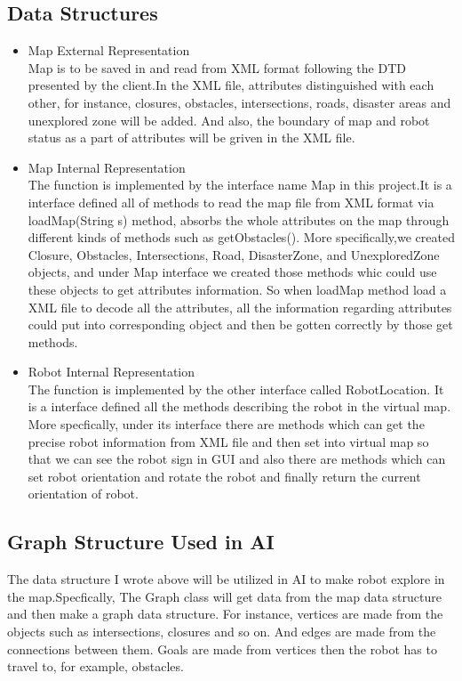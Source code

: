\documentclass[11pt, a4paper,titlepage]{article}
\begin{document}
    \subsection{Data Structures}
    \begin{itemize}
    \item Map External Representation\\
Map is to be saved in and read from XML format following the DTD presented by the client.In the XML file, attributes distinguished with each other, for instance, closures, obstacles, intersections, roads, disaster areas and unexplored zone will be added. And also, the boundary of map and robot status as a part of attributes will be griven in the XML file.
\item Map Internal Representation\\
The function is implemented by the interface name Map in this project.It is a interface defined all of methods to read the map file from XML format via loadMap(String s) method, absorbs the whole attributes on the map through different kinds of methods such as getObstacles(). More specifically,we created Closure, Obstacles, Intersections, Road, DisasterZone, and UnexploredZone objects, and under Map interface we created those methods whic could use these objects to get attributes information. So when loadMap method load a XML file to decode all the attributes, all the information regarding attributes could put into corresponding object and then be gotten correctly by those get methods.
\item Robot Internal Representation\\
The function is implemented by the other interface called RobotLocation. It is a interface defined all the methods describing the robot in the virtual map. More specfically, under its interface there are methods which can get the precise robot information from XML file and then set into virtual map so that we can see the robot sign in GUI and also there are methods which can set robot orientation and rotate the robot and finally return the current orientation of robot.   
    \end{itemize}
  \subsection{Graph Structure Used in AI}
The data structure I wrote above will be utilized in AI to make robot explore in the map.Specfically, The Graph class will get data from the map data structure and then make a graph data structure. For instance, vertices are made from the objects such as intersections, closures and so on. And edges are made from the connections between them. Goals are made from vertices then the robot has to travel to, for example, obstacles.    
  
\end{document}
